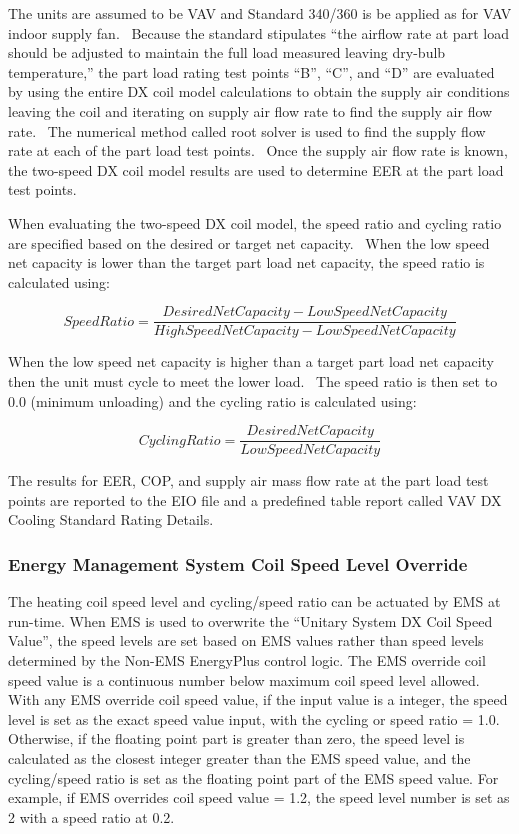 The units are assumed to be VAV and Standard 340/360 is be applied as for VAV indoor supply fan.~ Because the standard stipulates ``the airflow rate at part load should be adjusted to maintain the full load measured leaving dry-bulb temperature,'' the part load rating test points ``B'', ``C'', and ``D'' are evaluated by using the entire DX coil model calculations to obtain the supply air conditions leaving the coil and iterating on supply air flow rate to find the supply air flow rate.~ The numerical method called root solver is used to find the supply flow rate at each of the part load test points.~ Once the supply air flow rate is known, the two-speed DX coil model results are used to determine EER at the part load test points.

When evaluating the two-speed DX coil model, the speed ratio and cycling ratio are specified based on the desired or target net capacity.~ When the low speed net capacity is lower than the target part load net capacity, the speed ratio is calculated using:

\begin{equation}
SpeedRatio = \frac{{DesiredNetCapacity - LowSpeedNetCapacity}}{{HighSpeedNetCapacity - LowSpeedNetCapacity}}
\end{equation}

When the low speed net capacity is higher than a target part load net capacity then the unit must cycle to meet the lower load.~ The speed ratio is then set to 0.0 (minimum unloading) and the cycling ratio is calculated using:

\begin{equation}
CyclingRatio = \frac{{DesiredNetCapacity}}{{LowSpeedNetCapacity}}
\end{equation}

The results for EER, COP, and supply air mass flow rate at the part load test points are reported to the EIO file and a predefined table report called VAV DX Cooling Standard Rating Details.

\subsubsection{Energy Management System Coil Speed Level Override}\label{energy-management-system-coil-speed-level-override-2}

The heating coil speed level and cycling/speed ratio can be actuated by EMS at run-time. When EMS is used to overwrite the “Unitary System DX Coil Speed Value”, the speed levels are set based on EMS values rather than speed levels determined by the Non-EMS EnergyPlus control logic. The EMS override coil speed value is a continuous number below maximum coil speed level allowed. With any EMS override coil speed value, if the input value is a integer, the speed level is set as the exact speed value input, with the cycling or speed ratio = 1.0. Otherwise, if the floating point part is greater than zero, the speed level is calculated as the closest integer greater than the EMS speed value, and the cycling/speed ratio is set as the floating point part of the EMS speed value. For example, if EMS overrides coil speed value = 1.2, the speed level number is set as 2 with a speed ratio at 0.2.

